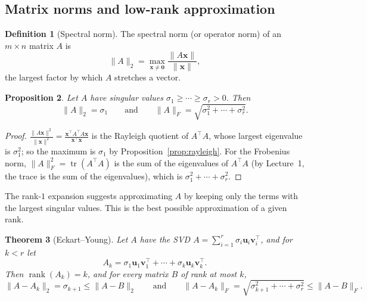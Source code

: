 \documentclass[11pt]{article}
\newcommand{\norm}[1]{\lVert #1 \rVert}
\theoremstyle{definition}
\newtheorem{definition}{Definition}[section]
\theoremstyle{plain}
\newtheorem{theorem}[definition]{Theorem}
\newtheorem{proposition}[definition]{Proposition}
\theoremstyle{remark}
\DeclareMathOperator{\rank}{rank}
\DeclareMathOperator{\tr}{tr}
\begin{document}
\subsection{Matrix norms and low-rank approximation}

\begin{definition}[Spectral norm]
    The spectral norm (or operator norm) of an $m \times n$ matrix $A$ is
    \[\norm{A}_2 = \max_{\mathbf{x} \neq \mathbf{0}} \frac{\norm{A\mathbf{x}}}{\norm{\mathbf{x}}},\]
    the largest factor by which $A$ stretches a vector.
\end{definition}

\begin{proposition}\label{prop:matrix-norms}
    Let $A$ have singular values $\sigma_1 \geq \cdots \geq \sigma_r > 0$. Then
    \[\norm{A}_2 = \sigma_1 \qquad \text{and} \qquad \norm{A}_F = \sqrt{\sigma_1^2 + \cdots + \sigma_r^2}.\]
\end{proposition}

\begin{proof}
    $\frac{\norm{A\mathbf{x}}^2}{\norm{\mathbf{x}}^2} = \frac{\mathbf{x}^\top A^\top A \mathbf{x}}{\mathbf{x}^\top \mathbf{x}}$ is the Rayleigh quotient of $A^\top A$, whose largest eigenvalue is $\sigma_1^2$; so the maximum is $\sigma_1$ by Proposition~\ref{prop:rayleigh}. For the Frobenius norm, $\norm{A}_F^2 = \tr(A^\top A)$ is the sum of the eigenvalues of $A^\top A$ (by Lecture~1, the trace is the sum of the eigenvalues), which is $\sigma_1^2 + \cdots + \sigma_r^2$.
\end{proof}

The rank-$1$ expansion suggests approximating $A$ by keeping only the terms with the largest singular values. This is the best possible approximation of a given rank.

\begin{theorem}[Eckart--Young]\label{thm:eckart-young}
    Let $A$ have the SVD $A = \sum_{i=1}^r \sigma_i \mathbf{u}_i \mathbf{v}_i^\top$, and for $k < r$ let
    \[A_k = \sigma_1 \mathbf{u}_1 \mathbf{v}_1^\top + \cdots + \sigma_k \mathbf{u}_k \mathbf{v}_k^\top.\]
    Then $\rank(A_k) = k$, and for every matrix $B$ of rank at most $k$,
    \[\norm{A - A_k}_2 = \sigma_{k+1} \leq \norm{A - B}_2 \qquad \text{and} \qquad \norm{A - A_k}_F = \sqrt{\sigma_{k+1}^2 + \cdots + \sigma_r^2} \leq \norm{A - B}_F.\]
\end{theorem}
\end{document}
